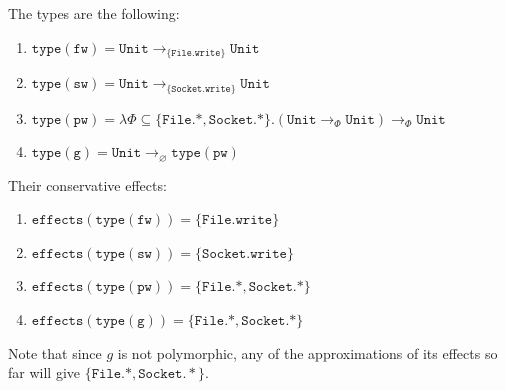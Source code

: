 \documentclass{llncs}
\newcommand{\keywadj}[1]{\mathtt{#1}}
\newcommand{\kwa}[1]{\keywadj{ #1 }}
\newcommand{\Unit}[0]{ \kwa{Unit} }
\begin{document}
\noindent
The types are the following:

\begin{enumerate}
   \item $\kwa{type(fw)} = \Unit \rightarrow_{\kwa{\{File.write\}}} \Unit$
   \item $\kwa{type(sw)} = \Unit \rightarrow_{\kwa{\{Socket.write\}}} \Unit$
   \item $\kwa{type(pw)} = \lambda \Phi \subseteq \kwa{\{File.*, Socket.*\}}. (\Unit \rightarrow_{\Phi} \Unit) \rightarrow_{\Phi} \Unit$
   \item $\kwa{type(g)} = \Unit \rightarrow_{\varnothing} \kwa{type(pw)} $
\end{enumerate}

\noindent
Their conservative effects:

\begin{enumerate}
	\item $\kwa{effects(type(fw)) = \{File.write\}}$
	\item $\kwa{effects(type(sw)) = \{Socket.write\}}$
	\item $\kwa{effects(type(pw)) = \{File.*, Socket.*\}}$
	\item $\kwa{effects(type(g)) = \{File.*, Socket.*\}}$
\end{enumerate}

\noindent
Note that since $g$ is not polymorphic, any of the approximations of its effects so far will give $\{ \kwa{File.*, Socket.*} \}$.
\end{document}
